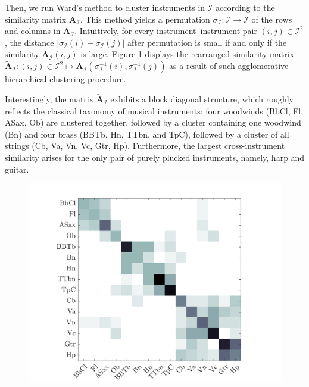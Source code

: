 \documentclass{bmcart}
\begin{document}
Then, we run Ward's method to cluster instruments in $\mathcal{I}$ according to the similarity matrix $\mathbf{A}_{\mathcal{I}}$.
This method yields a permutation $\sigma_{\mathcal{I}}: \mathcal{I} \rightarrow \mathcal{I}$ of the rows and columns in $\mathbf{A}_{\mathcal{I}}$.
Intuitively, for every instrument--instrument pair $(i, j) \in \mathcal{I}^2$, the distance $\vert \sigma_{\mathcal{I}}(i) - \sigma_{\mathcal{I}}(j) \vert$ after permutation is small if and only if the similarity $\mathbf{A}_{\mathcal{I}}(i, j)$ is large.
Figure \ref{fig:consensusVsI} displays the rearranged similarity matrix $\widetilde{\mathbf{A}}_{\mathcal{I}} : (i,j)\in \mathcal{I}^2 \mapsto \mathbf{A}_{\mathcal{I}}(\sigma_{\mathcal{I}}^{-1}(i), \sigma_{\mathcal{I}}^{-1}(j))$ as a result of such agglomerative hierarchical clustering procedure.

Interestingly, the matrix $\widetilde{\mathbf{A}}_{\mathcal{I}}$ exhibits a block diagonal structure, which roughly reflects the classical taxonomy of musical instruments: four woodwinds (BbCl, Fl, ASax, Ob) are clustered together, followed by a cluster containing one woodwind (Bn) and four brass (BBTb, Hn, TTbn, and TpC), followed by a cluster of all strings (Cb, Va, Vn, Vc, Gtr, Hp).
Furthermore, the largest cross-instrument similarity arises for the only pair of purely plucked instruments, namely, harp and guitar.

\begin{figure}
\center
\includegraphics[width = \textwidth]{figures/consensusVsI.png}
\caption{
}
\label{fig:consensusVsI}
\end{figure}
\end{document}
